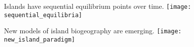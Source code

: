 \documentclass[t]{beamer}
\begin{document}
\begin{frame}{Islands have sequential equilibrium points over time.}
	\centering
		\texttt{[image: sequential\_equilibria]}
\end{frame}


\begin{frame}{New models of island biogeography are emerging.}
	\centering
			\texttt{[image: new\_island\_paradigm]}
\end{frame}
\end{document}
